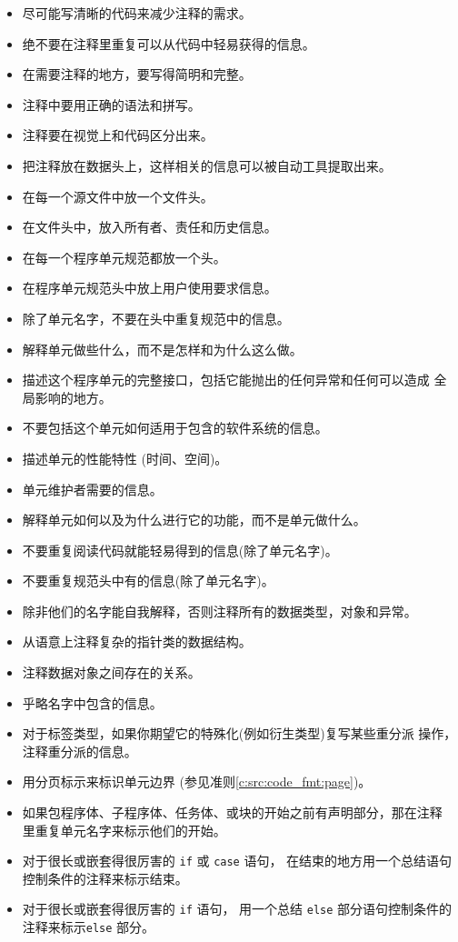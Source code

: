 \noindent
\begin{itemize}
    \item 尽可能写清晰的代码来减少注释的需求。
    \item 绝不要在注释里重复可以从代码中轻易获得的信息。
    \item 在需要注释的地方，要写得简明和完整。
    \item 注释中要用正确的语法和拼写。
    \item 注释要在视觉上和代码区分出来。
    \item 把注释放在数据头上，这样相关的信息可以被自动工具提取出来。

    \item 在每一个源文件中放一个文件头。
    \item 在文件头中，放入所有者、责任和历史信息。

    \item 在每一个程序单元规范都放一个头。
    \item 在程序单元规范头中放上用户使用要求信息。
    \item 除了单元名字，不要在头中重复规范中的信息。
    \item 解释单元做些什么，而不是怎样和为什么这么做。
    \item 描述这个程序单元的完整接口，包括它能抛出的任何异常和任何可以造成
全局影响的地方。
    \item 不要包括这个单元如何适用于包含的软件系统的信息。
    \item 描述单元的性能特性 (时间、空间)。

    \item 单元维护者需要的信息。
    \item 解释单元如何以及为什么进行它的功能，而不是单元做什么。
    \item 不要重复阅读代码就能轻易得到的信息(除了单元名字)。
    \item 不要重复规范头中有的信息(除了单元名字)。

    \item 除非他们的名字能自我解释，否则注释所有的数据类型，对象和异常。
    \item 从语意上注释复杂的指针类的数据结构。
    \item 注释数据对象之间存在的关系。
    \item 乎略名字中包含的信息。
    \item 对于标签类型，如果你期望它的特殊化(例如衍生类型)复写某些重分派
    操作，注释重分派的信息。

    \item 用分页标示来标识单元边界 (参见准则\ref{c:src:code_fmt:page})。
    \item 如果包程序体、子程序体、任务体、或块的开始之前有声明部分，那在注释
    里重复单元名字来标示他们的开始。
    \item 对于很长或嵌套得很厉害的 \texttt{if} 或 \texttt{case} 语句，
    在结束的地方用一个总结语句控制条件的注释来标示结束。
    \item 对于很长或嵌套得很厉害的 \texttt{if} 语句，
    用一个总结 \texttt{else} 部分语句控制条件的注释来标示\texttt{else} 部分。
\end{itemize}


